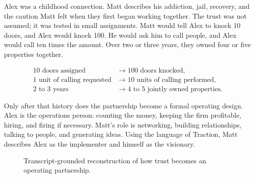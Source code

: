 Alex was a childhood connection. Matt describes his addiction, jail, recovery, and the caution Matt felt when they first began working together. The trust was not assumed; it was tested in small assignments. Matt would tell Alex to knock 10 doors, and Alex would knock 100. He would ask him to call people, and Alex would call ten times the amount. Over two or three years, they owned four or five properties together.

\begin{align}
10\text{ doors assigned} &\longrightarrow 100\text{ doors knocked},\\
1\text{ unit of calling requested} &\longrightarrow 10\text{ units of calling performed},\\
2\text{ to }3\text{ years} &\longrightarrow 4\text{ to }5\text{ jointly owned properties}.
\end{align}

Only after that history does the partnership become a formal operating design. Alex is the operations person: counting the money, keeping the firm profitable, hiring, and firing if necessary. Matt's role is networking, building relationships, talking to people, and generating ideas. Using the language of Traction, Matt describes Alex as the implementer and himself as the visionary.

\begin{figure}
\centering
{}
\caption{Transcript-grounded reconstruction of how trust becomes an operating partnership.}
\end{figure}

